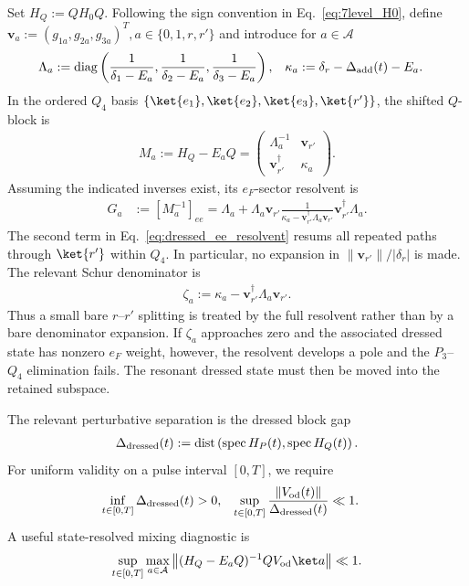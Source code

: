 Set $H_Q:=QH_0Q$.  Following the sign convention in
Eq.~\eqref{eq:7level_H0}, define
$\mathbf v_a:=(g_{1a},g_{2a},g_{3a})^T,
a\in\{0,1,r,r'\}$
and introduce for $a\in\mathcal A$
\begin{align}
\Lambda_a
&:=
\operatorname{diag}\left(
\frac{1}{\delta_1-E_a},
\frac{1}{\delta_2-E_a},
\frac{1}{\delta_3-E_a}
\right),
&
\kappa_a
&:=\delta_r-\Delta_{\rm add}(t)-E_a.
\label{eq:dressed_resolvent_parameters}
\end{align}
In the ordered $Q_4$ basis
$\{\ket{e_1},\ket{e_2},\ket{e_3},\ket{r'}\}$, the shifted $Q$-block is
\begin{align}
M_a
:=H_Q-E_aQ =
\begin{pmatrix}
\Lambda_a^{-1}&\mathbf v_{r'}\\
\mathbf v_{r'}^\dagger&\kappa_a
\end{pmatrix}.
\label{eq:dressed_Q_block}
\end{align}
Assuming the indicated inverses exist, its $e_F$-sector resolvent is
\begin{align}
G_a
&:=\left[M_a^{-1}\right]_{ee}=
\Lambda_a
+
\Lambda_a\mathbf v_{r'}
\frac{1}{
\kappa_a-\mathbf v_{r'}^\dagger\Lambda_a\mathbf v_{r'}
}
\mathbf v_{r'}^\dagger\Lambda_a.
\label{eq:dressed_ee_resolvent}
\end{align}
The second term in Eq.~\eqref{eq:dressed_ee_resolvent} resums all repeated
paths through $\ket{r'}$ within $Q_4$.
In particular, no expansion in
$\|\mathbf v_{r'}\|/|\delta_r|$ is made.  The relevant Schur denominator is
\begin{align}
\zeta_a
:=
\kappa_a-\mathbf v_{r'}^\dagger\Lambda_a\mathbf v_{r'}.
\label{eq:dressed_schur_denominator}
\end{align}
Thus a small bare $r$--$r'$ splitting is treated by the full resolvent rather
than by a bare denominator expansion.  If $\zeta_a$ approaches zero and the
associated dressed state has nonzero $e_F$ weight, however, the resolvent
develops a pole and the $P_3$--$Q_4$ elimination fails.  The resonant dressed
state must then be moved into the retained subspace.

The relevant perturbative separation is the dressed block gap
\begin{align}
\Delta_{\rm dressed}(t)
:=
\operatorname{dist}\left(
\operatorname{spec}H_P(t),
\operatorname{spec}H_Q(t)
\right).
\label{eq:dressed_block_gap}
\end{align}
For uniform validity on a pulse interval $[0,T]$, we require
\begin{align}
\inf_{t\in[0,T]}\Delta_{\rm dressed}(t)&>0,&
\sup_{t\in[0,T]}
\frac{\|V_{\rm od}(t)\|}{\Delta_{\rm dressed}(t)}&\ll1.
\label{eq:dressed_uniform_condition}
\end{align}
A useful state-resolved mixing diagnostic is
\begin{align}
\sup_{t\in[0,T]}\max_{a\in\mathcal A}
\left\|(H_Q-E_aQ)^{-1}QV_{\rm od}\ket a\right\|\ll1.
\end{align}

